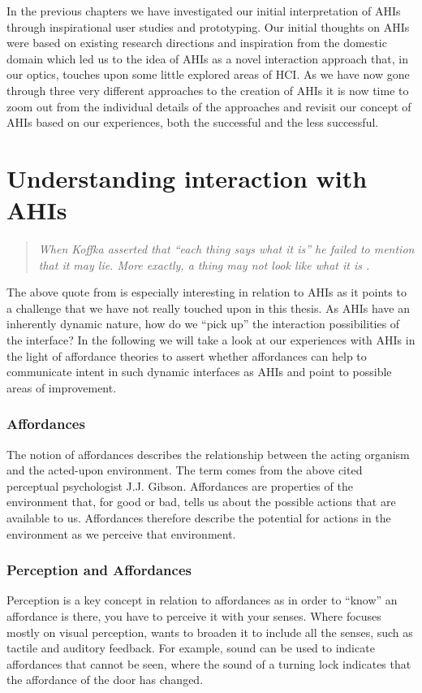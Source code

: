 In the previous chapters we have investigated our initial interpretation of AHIs through inspirational user studies and prototyping.
Our initial thoughts on AHIs were based on existing research directions and inspiration from the domestic domain which led us to the idea of AHIs as a novel interaction approach that, in our optics, touches upon some little explored areas of HCI.  
As we have now gone through three very different approaches to the creation of AHIs it is now time to zoom out from the individual details of the approaches and revisit our concept of AHIs based on our experiences, both the successful and the less successful.


\section{Understanding interaction with AHIs}
\begin{quotation}
\emph{When Koffka asserted that ``each thing says what it is'' he failed to mention that it may lie. More exactly, a thing may not look like what it is \citep{gibson1979ecological}.}
\end{quotation}
The above quote from \citeauthor{gibson1979ecological} is especially interesting in relation to AHIs as it points to a challenge that we have not really touched upon in this thesis.
As AHIs have an inherently dynamic nature, how do we ``pick up'' the interaction possibilities of the interface? 
In the following we will take a look at our experiences with AHIs in the light of affordance theories to assert whether affordances can help to communicate intent in such dynamic interfaces as AHIs and point to possible areas of improvement.

\subsubsection{Affordances}
The notion of affordances describes the relationship between the acting organism and the acted-upon environment.
The term comes from the above cited perceptual psychologist J.J. Gibson.
Affordances are properties of the environment that, for good or bad, tells us about the possible actions that are available to us.
Affordances therefore describe the potential for actions in the environment as we perceive that environment.  

\subsubsection{Perception and Affordances}
Perception is a key concept in relation to affordances as in order to ``know'' an affordance is there, you have to perceive it with your senses. Where \citet{gibson1979ecological} focuses mostly on visual perception, \citet{gaver1991technology} wants to broaden it to include all the senses, such as tactile and auditory feedback.
For example, sound can be used to indicate affordances that cannot be seen, where the sound of a turning lock indicates that the affordance of the door has changed.

